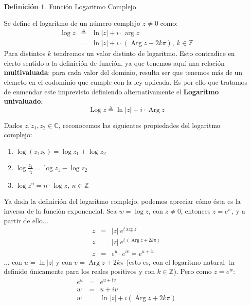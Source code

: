 \documentclass[12pt]{article}
\theoremstyle{definition}
\newtheorem{definition}{Definici\'on}[section]
\theoremstyle{theorem}
\DeclareMathOperator{\Arg}{Arg}
\DeclareMathOperator{\Log}{Log}
\begin{document}
\colorbox{red!40!white!80}{\parbox{\linewidth}{
\theoremstyle{definition}
\begin{definition}{Funci\'on Logaritmo Complejo}

Se define el logaritmo de un n\'umero complejo $z\neq 0$ como:
\begin{eqnarray*}
\log z &\triangleq& \ln |z| + i \cdot \arg z \\
&=& \ln |z| + i \cdot (\Arg z + 2k\pi),\ k \in \mathbb{Z}
\end{eqnarray*}
Para distintos $k$ tendremos un valor distinto de logaritmo. Esto contradice en cierto sentido a la definici\'on de funci\'on, ya que tenemos aqu\'i una relaci\'on \textbf{multivaluada}: para cada valor del dominio, resulta ser que tenemos m\'as de un elemeto en el codominio que cumple con la ley aplicada. Es por ello que tratamos de enmendar este imprevisto definiendo alternativamente el \textbf{Logaritmo univaluado}:
$$\Log z \triangleq \ln |z| + i\cdot \Arg z$$

\end{definition}}}
\linebreak
\linebreak

Dados $z, z_1, z_2 \in \mathbb{C}$, reconocemos las siguientes propiedades del logaritmo complejo:
\begin{enumerate}
	\item $\log (z_1z_2) = \log z_1 + \log z_2$
	\item $\displaystyle\log \frac{z_1}{z_2} = \log z_1 - \log z_2$
	\item $\log z^n = n\cdot \log z,\ n \in \mathbb{Z}$
\end{enumerate}

Ya dada la definici\'on del logaritmo complejo, podemos apreciar c\'omo \'esta es la inversa de la funci\'on exponencial. Sea $w = \log z$, con $z \neq 0$, entonces $z=e^w$, y a partir de ello...
\begin{eqnarray*}
z &=& |z|\ e^{i \arg z}\\
z &=& |z|\ e^{i\ (\Arg z + 2k\pi)}\\
z &=& e^u \cdot e^{iv} = e^{u+iv}
\end{eqnarray*}
... con $u = \ln |z|$ y con $v = \Arg z + 2k\pi$ (esto es, con el logaritmo natural $\ln$ definido \'unicamente para los reales positivos y con $k \in \mathbb{Z}$). Pero como $z = e^w$:
\begin{eqnarray*}
e^w &=& e^{u+iv}\\
w &=& u+iv\\
w &=& \ln |z| + i(\Arg z + 2k\pi)
\end{eqnarray*}
\end{document}
